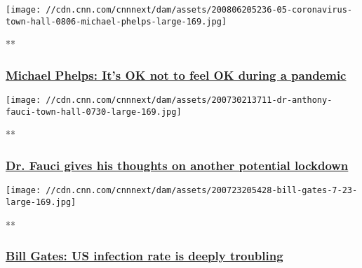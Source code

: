 \href{/videos/health/2020/08/07/michael-phelps-mental-health-challenges-pandemic-town-hall-vpx.cnn/video/playlists/cnn-coronavirus-town-hall/}{}

\texttt{[image: //cdn.cnn.com/cnnnext/dam/assets/200806205236-05-coronavirus-town-hall-0806-michael-phelps-large-169.jpg]}

**

\hypertarget{michael-phelps-its-ok-not-to-feel-ok-during-a-pandemic}{%
\subsubsection{\texorpdfstring{\href{/videos/health/2020/08/07/michael-phelps-mental-health-challenges-pandemic-town-hall-vpx.cnn/video/playlists/cnn-coronavirus-town-hall/}{Michael
Phelps: It's OK not to feel OK during a
pandemic}}{Michael Phelps: It's OK not to feel OK during a pandemic}}\label{michael-phelps-its-ok-not-to-feel-ok-during-a-pandemic}}

\href{/videos/health/2020/07/31/fauci-another-lockdown-coronavirus-pandemic-curve-impossible-predict-town-hall-bts-vpx.cnn/video/playlists/cnn-coronavirus-town-hall/}{}

\texttt{[image: //cdn.cnn.com/cnnnext/dam/assets/200730213711-dr-anthony-fauci-town-hall-0730-large-169.jpg]}

**

\hypertarget{dr-fauci-gives-his-thoughts-on-another-potential-lockdown}{%
\subsubsection{\texorpdfstring{\href{/videos/health/2020/07/31/fauci-another-lockdown-coronavirus-pandemic-curve-impossible-predict-town-hall-bts-vpx.cnn/video/playlists/cnn-coronavirus-town-hall/}{Dr.
Fauci gives his thoughts on another potential
lockdown}}{Dr. Fauci gives his thoughts on another potential lockdown}}\label{dr-fauci-gives-his-thoughts-on-another-potential-lockdown}}

\href{/videos/politics/2020/07/24/bill-gates-coronavirus-infection-rate-town-hall-sot-vpx.cnn/video/playlists/cnn-coronavirus-town-hall/}{}

\texttt{[image: //cdn.cnn.com/cnnnext/dam/assets/200723205428-bill-gates-7-23-large-169.jpg]}

**

\hypertarget{bill-gates-us-infection-rate-is-deeply-troubling}{%
\subsubsection{\texorpdfstring{\href{/videos/politics/2020/07/24/bill-gates-coronavirus-infection-rate-town-hall-sot-vpx.cnn/video/playlists/cnn-coronavirus-town-hall/}{Bill
Gates: US infection rate is deeply
troubling}}{Bill Gates: US infection rate is deeply troubling}}\label{bill-gates-us-infection-rate-is-deeply-troubling}}

